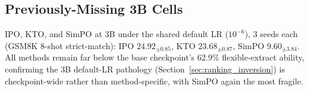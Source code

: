 \documentclass{article}
\begin{document}
\subsection{Previously-Missing 3B Cells}
\label{app:3b_fill}

IPO, KTO, and SimPO at 3B under the shared default LR ($10^{-6}$), 3 seeds each (GSM8K 8-shot strict-match): IPO $24.92_{\pm 0.85}$, KTO $23.68_{\pm 0.87}$, SimPO $9.60_{\pm 3.84}$. All methods remain far below the base checkpoint's 62.9\% flexible-extract ability, confirming the 3B default-LR pathology (Section~\ref{sec:ranking_inversion}) is checkpoint-wide rather than method-specific, with SimPO again the most fragile.
\end{document}
